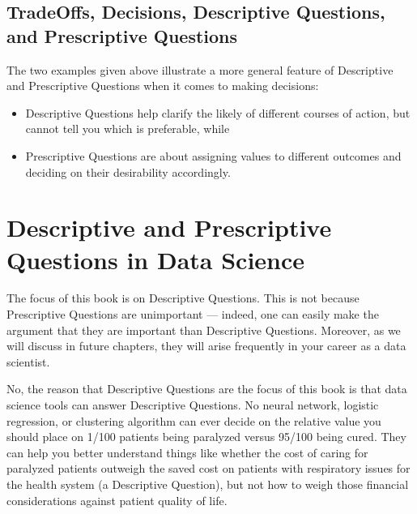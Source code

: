 \documentclass[letterpaper,10pt,english]{jupyterBook}
\begin{document}
\subsection{Trade\sphinxhyphen{}Offs, Decisions, Descriptive Questions, and Prescriptive Questions}
\label{\detokenize{30_questions/05_descriptive_v_prescriptive:trade-offs-decisions-descriptive-questions-and-prescriptive-questions}}
\sphinxAtStartPar
The two examples given above illustrate a more general feature of Descriptive and Prescriptive Questions when it comes to making decisions:
\begin{itemize}
\item {} 
\sphinxAtStartPar
Descriptive Questions help clarify the likely  of different courses of action, but cannot tell you which is preferable, while

\item {} 
\sphinxAtStartPar
Prescriptive Questions are about assigning values to different outcomes and deciding on their desirability accordingly.

\end{itemize}


\section{Descriptive and Prescriptive Questions in Data Science}
\label{\detokenize{30_questions/05_descriptive_v_prescriptive:descriptive-and-prescriptive-questions-in-data-science}}
\sphinxAtStartPar
The focus of this book is on Descriptive Questions. This is not because Prescriptive Questions are unimportant — indeed, one can easily make the argument that they are  important than Descriptive Questions. Moreover, as we will discuss in future chapters, they will arise frequently in your career as a data scientist.

\sphinxAtStartPar
No, the reason that Descriptive Questions are the focus of this book is that data science tools can  answer Descriptive Questions. No neural network, logistic regression, or clustering algorithm can ever decide on the relative value you should place on 1/100 patients being paralyzed versus 95/100 being cured. They can help you better understand things like whether the cost of caring for paralyzed patients outweigh the saved cost on patients with respiratory issues for the health system (a Descriptive Question), but not how to weigh those financial considerations against patient quality of life.
\end{document}
